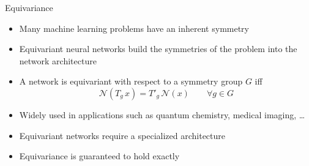 \documentclass[
                20pt,
                final,
                hyperref={%
                    breaklinks=true,%
                    letterpaper=true,%
                    colorlinks,%
                    bookmarks=false%
                }]{beamer}
\newlength{\onecolwid}
\begin{document}
\begin{frame}[t]
\begin{columns}[t]
\begin{column}{\onecolwid}
                \begin{alertblock}{\huge{Equivariance}}
                        \begin{itemize}
                            \item{Many machine learning problems have an inherent symmetry}
                            \item Equivariant neural networks build the symmetries of the problem into the network architecture
                            \item A network is equivariant with respect to a symmetry group $ G $ iff \[ \mathcal{N}(T_g\, x)= T'_g\, \mathcal{N}(x)\qquad  \forall g\in G \]
                            \item Widely used in applications such as quantum chemistry, medical imaging, \dots
                            \item Equivariant networks require a specialized architecture
                            \item Equivariance is guaranteed to hold exactly

                        \end{itemize}




\end{alertblock}
\end{column}
\end{columns}
\end{frame}
\end{document}
